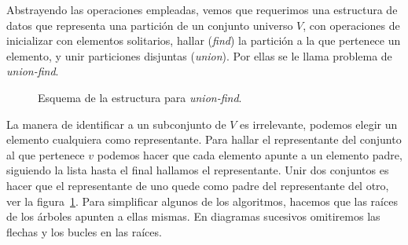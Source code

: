   Abstrayendo las operaciones empleadas,
  vemos que requerimos una estructura de datos
  que representa una partición de un conjunto universo \(V\),
  con operaciones de inicializar con elementos solitarios,
  hallar
  (\emph{\foreignlanguage{english}{find}})
  la partición a la que pertenece un elemento,
  y unir particiones disjuntas
  (\emph{\foreignlanguage{english}{union}}).
  Por ellas se le llama
  problema de \emph{\foreignlanguage{english}{union-find}}.
  \begin{figure}[ht]
    \centering
    \caption{Esquema de la estructura para
             \emph{\foreignlanguage{english}{union-find}}.}
    \label{fig:union-find-estructura}
  \end{figure}
  La manera de identificar a un subconjunto de \(V\) es irrelevante,
  podemos elegir un elemento cualquiera como representante.
  Para hallar el representante del conjunto al que pertenece \(v\)
  podemos hacer que cada elemento apunte a un elemento padre,
  siguiendo la lista hasta el final hallamos el representante.
  Unir dos conjuntos es hacer que el representante de uno
  quede como padre del representante del otro,
  ver la figura~\ref{fig:union-find-estructura}.
  Para simplificar algunos de los algoritmos,
  hacemos que las raíces de los árboles apunten a ellas mismas.
  En diagramas sucesivos omitiremos las flechas
  y los bucles en las raíces.

